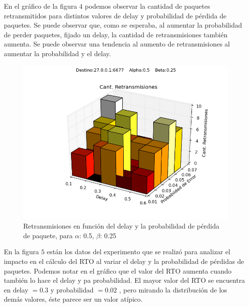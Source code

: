 En el gráfico de la figura $4$ podemos observar la cantidad de paquetes retransmitidos para distintos valores de delay y probabilidad de pérdida de paquetes. Se puede observar que, como se esperaba, al aumentar la probabilidad de perder paquetes, fijado un delay, la cantidad de retransmisiones también aumenta. Se puede observar una tendencia al aumento de retransmisiones al aumentar la probabilidad y el delay.

\begin{figure}[H]
  \centering	
	\includegraphics[scale=0.5]{../analisis/graficos_tablas/graficos_en_funcion_de_delay_probaerror/0.5-0.25_2/retransmisiones.png}
  \caption{Retransmisiones en funci\'on del delay y la probabilidad de pérdida de paquete, para $\alpha$: 0.5, $\beta$: 0.25}
	\label{fig:histo-src-sitiotrabajo}
\end{figure}

En la figura $5$ están los datos del experimento que se realizó para analizar el impacto en el cálculo del RTO al variar el delay y la probabilidad de pérdidas de paquetes. Podemos notar en el gráfico que el valor del RTO aumenta cuando también lo hace el delay y pa probabilidad. El mayor valor del RTO se encuentra en delay $= 0.3$ y probabilidad $= 0.02$ , pero mirando la distribución de los demás valores, éste parece ser un valor atípico.

